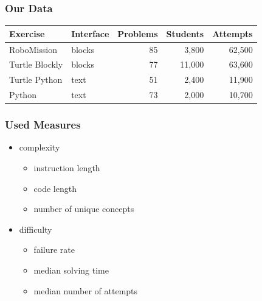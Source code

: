 \documentclass[bigger]{beamer}
\begin{document}
\begin{frame}
\frametitle{Our Data}
\begin{table}[bt]
    \centering
    \begin{tabular}{l l r r r}
        \toprule
        Exercise & Interface & Problems & Students & Attempts  \\
        \midrule
        RoboMission & blocks & 85 & 3,800 & 62,500  \\
        Turtle Blockly & blocks & 77 & 11,000 & 63,600  \\
        Turtle Python & text & 51 & 2,400 & 11,900  \\
        Python & text & 73 & 2,000 & 10,700  \\
        \bottomrule
    \end{tabular}
    \label{tbl:data}
\end{table}
\end{frame}

\begin{frame}
\frametitle{Used Measures}
\begin{itemize}
    \item complexity
    \begin{itemize}
        \item instruction length
        \item code length
        \item number of unique concepts
    \end{itemize}
    \item difficulty
    \begin{itemize}
        \item failure rate
        \item median solving time
        \item median number of attempts
    \end{itemize}
\end{itemize}

\end{frame}
\end{document}
